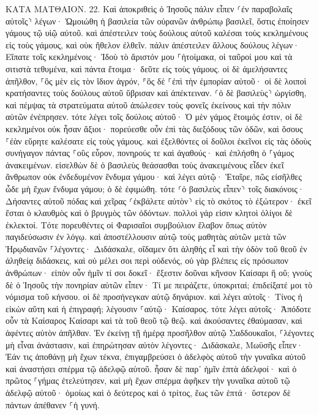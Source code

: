 \documentclass[twoside, 9pt]{extreport}
\begin{document}
ΚΑΤΑ ΜΑΤΘΑΙΟΝ.
22.
Καὶ ἀποκριθεὶς ὁ Ἰησοῦς πάλιν εἶπεν ⸂ἐν παραβολαῖς αὐτοῖς⸃ λέγων· 
Ὡμοιώθη ἡ βασιλεία τῶν οὐρανῶν ἀνθρώπῳ βασιλεῖ, ὅστις ἐποίησεν γάμους τῷ υἱῷ αὐτοῦ. 
καὶ ἀπέστειλεν τοὺς δούλους αὐτοῦ καλέσαι τοὺς κεκλημένους εἰς τοὺς γάμους, καὶ οὐκ ἤθελον ἐλθεῖν. 
πάλιν ἀπέστειλεν ἄλλους δούλους λέγων· Εἴπατε τοῖς κεκλημένοις· Ἰδοὺ τὸ ἄριστόν μου ⸀ἡτοίμακα, οἱ ταῦροί μου καὶ τὰ σιτιστὰ τεθυμένα, καὶ πάντα ἕτοιμα· δεῦτε εἰς τοὺς γάμους. 
οἱ δὲ ἀμελήσαντες ἀπῆλθον, ⸀ὃς μὲν εἰς τὸν ἴδιον ἀγρόν, ⸁ὃς δὲ ⸀ἐπὶ τὴν ἐμπορίαν αὐτοῦ· 
οἱ δὲ λοιποὶ κρατήσαντες τοὺς δούλους αὐτοῦ ὕβρισαν καὶ ἀπέκτειναν. 
⸂ὁ δὲ βασιλεὺς⸃ ὠργίσθη, καὶ πέμψας τὰ στρατεύματα αὐτοῦ ἀπώλεσεν τοὺς φονεῖς ἐκείνους καὶ τὴν πόλιν αὐτῶν ἐνέπρησεν. 
τότε λέγει τοῖς δούλοις αὐτοῦ· Ὁ μὲν γάμος ἕτοιμός ἐστιν, οἱ δὲ κεκλημένοι οὐκ ἦσαν ἄξιοι· 
πορεύεσθε οὖν ἐπὶ τὰς διεξόδους τῶν ὁδῶν, καὶ ὅσους ⸀ἐὰν εὕρητε καλέσατε εἰς τοὺς γάμους. 
καὶ ἐξελθόντες οἱ δοῦλοι ἐκεῖνοι εἰς τὰς ὁδοὺς συνήγαγον πάντας ⸀οὓς εὗρον, πονηρούς τε καὶ ἀγαθούς· καὶ ἐπλήσθη ὁ ⸀γάμος ἀνακειμένων. 
εἰσελθὼν δὲ ὁ βασιλεὺς θεάσασθαι τοὺς ἀνακειμένους εἶδεν ἐκεῖ ἄνθρωπον οὐκ ἐνδεδυμένον ἔνδυμα γάμου· 
καὶ λέγει αὐτῷ· Ἑταῖρε, πῶς εἰσῆλθες ὧδε μὴ ἔχων ἔνδυμα γάμου; ὁ δὲ ἐφιμώθη. 
τότε ⸂ὁ βασιλεὺς εἶπεν⸃ τοῖς διακόνοις· Δήσαντες αὐτοῦ πόδας καὶ χεῖρας ⸂ἐκβάλετε αὐτὸν⸃ εἰς τὸ σκότος τὸ ἐξώτερον· ἐκεῖ ἔσται ὁ κλαυθμὸς καὶ ὁ βρυγμὸς τῶν ὀδόντων. 
πολλοὶ γάρ εἰσιν κλητοὶ ὀλίγοι δὲ ἐκλεκτοί. 
Τότε πορευθέντες οἱ Φαρισαῖοι συμβούλιον ἔλαβον ὅπως αὐτὸν παγιδεύσωσιν ἐν λόγῳ. 
καὶ ἀποστέλλουσιν αὐτῷ τοὺς μαθητὰς αὐτῶν μετὰ τῶν Ἡρῳδιανῶν ⸀λέγοντες· Διδάσκαλε, οἴδαμεν ὅτι ἀληθὴς εἶ καὶ τὴν ὁδὸν τοῦ θεοῦ ἐν ἀληθείᾳ διδάσκεις, καὶ οὐ μέλει σοι περὶ οὐδενός, οὐ γὰρ βλέπεις εἰς πρόσωπον ἀνθρώπων· 
εἰπὸν οὖν ἡμῖν τί σοι δοκεῖ· ἔξεστιν δοῦναι κῆνσον Καίσαρι ἢ οὔ; 
γνοὺς δὲ ὁ Ἰησοῦς τὴν πονηρίαν αὐτῶν εἶπεν· Τί με πειράζετε, ὑποκριταί; 
ἐπιδείξατέ μοι τὸ νόμισμα τοῦ κήνσου. οἱ δὲ προσήνεγκαν αὐτῷ δηνάριον. 
καὶ λέγει αὐτοῖς· Τίνος ἡ εἰκὼν αὕτη καὶ ἡ ἐπιγραφή; 
λέγουσιν ⸀αὐτῷ· Καίσαρος. τότε λέγει αὐτοῖς· Ἀπόδοτε οὖν τὰ Καίσαρος Καίσαρι καὶ τὰ τοῦ θεοῦ τῷ θεῷ. 
καὶ ἀκούσαντες ἐθαύμασαν, καὶ ἀφέντες αὐτὸν ἀπῆλθαν. 
Ἐν ἐκείνῃ τῇ ἡμέρᾳ προσῆλθον αὐτῷ Σαδδουκαῖοι, ⸀λέγοντες μὴ εἶναι ἀνάστασιν, καὶ ἐπηρώτησαν αὐτὸν 
λέγοντες· Διδάσκαλε, Μωϋσῆς εἶπεν· Ἐάν τις ἀποθάνῃ μὴ ἔχων τέκνα, ἐπιγαμβρεύσει ὁ ἀδελφὸς αὐτοῦ τὴν γυναῖκα αὐτοῦ καὶ ἀναστήσει σπέρμα τῷ ἀδελφῷ αὐτοῦ. 
ἦσαν δὲ παρ᾽ ἡμῖν ἑπτὰ ἀδελφοί· καὶ ὁ πρῶτος ⸀γήμας ἐτελεύτησεν, καὶ μὴ ἔχων σπέρμα ἀφῆκεν τὴν γυναῖκα αὐτοῦ τῷ ἀδελφῷ αὐτοῦ· 
ὁμοίως καὶ ὁ δεύτερος καὶ ὁ τρίτος, ἕως τῶν ἑπτά· 
ὕστερον δὲ πάντων ἀπέθανεν ⸀ἡ γυνή. 
\end{document}

